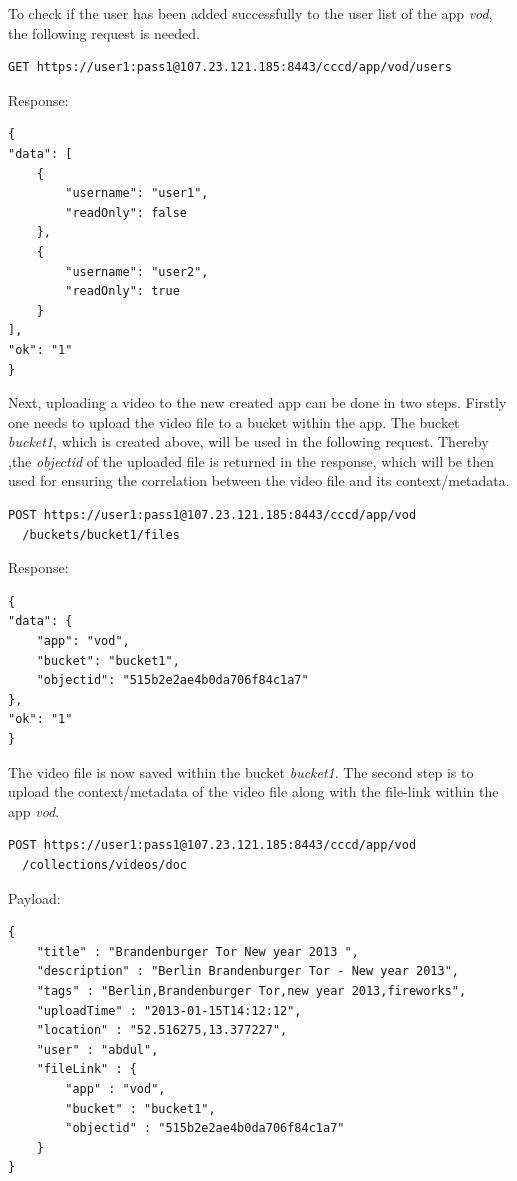 To check if the user has been added successfully to the user list of the app \textit{vod}, the following request is needed.

\begin{code}
\begin{verbatim}
GET https://user1:pass1@107.23.121.185:8443/cccd/app/vod/users
\end{verbatim}
Response:
\begin{verbatim}
{
"data": [
	{
		"username": "user1",
		"readOnly": false
	},
	{
		"username": "user2",
		"readOnly": true
	}
],
"ok": "1"
}
\end{verbatim}
\end{code}

Next, uploading a video to the new created app can be done in two steps. Firstly one needs to upload the video file to a bucket within the app. The bucket \textit{bucket1}, which is created above, will be used in the following request. Thereby ,the \textit{objectid} of the uploaded file is returned in the response, which will be then used for ensuring the correlation between the video file and its context/metadata.
\begin{code}
\begin{verbatim}
POST https://user1:pass1@107.23.121.185:8443/cccd/app/vod
  /buckets/bucket1/files
\end{verbatim}
Response:
\begin{verbatim}
{
"data": {
	"app": "vod",
	"bucket": "bucket1",
	"objectid": "515b2e2ae4b0da706f84c1a7"
},
"ok": "1"
}
\end{verbatim}
\end{code}

The video file is now saved within the bucket \textit{bucket1}. The second step is to upload the context/metadata of the video file along with the file-link within the app \textit{vod}.
\begin{code}
\begin{verbatim}
POST https://user1:pass1@107.23.121.185:8443/cccd/app/vod
  /collections/videos/doc
\end{verbatim}
Payload:
\begin{verbatim}
{
	"title" : "Brandenburger Tor New year 2013 ",
	"description" : "Berlin Brandenburger Tor - New year 2013",
	"tags" : "Berlin,Brandenburger Tor,new year 2013,fireworks",
	"uploadTime" : "2013-01-15T14:12:12",
	"location" : "52.516275,13.377227",
	"user" : "abdul",
	"fileLink" : {
		"app" : "vod",
		"bucket" : "bucket1", 
		"objectid" : "515b2e2ae4b0da706f84c1a7"
	}
}
\end{verbatim}
\end{code}

